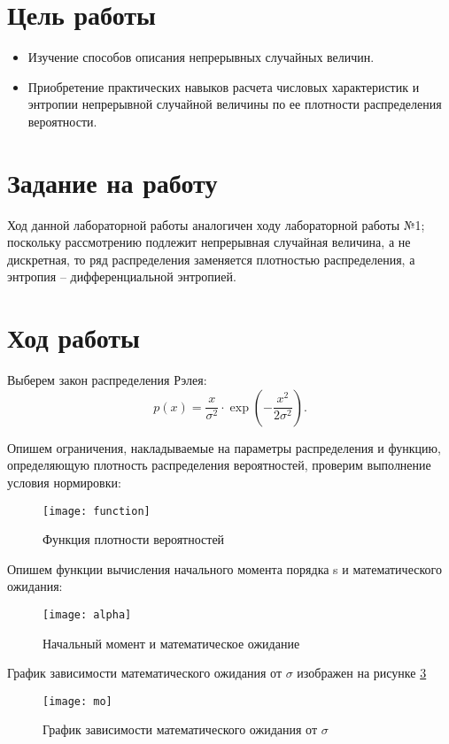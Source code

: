 \documentclass[a4paper,14pt]{extarticle}
\begin{document}

\section{Цель работы}
\begin{itemize}
    \item Изучение способов описания непрерывных случайных величин.
    \item Приобретение практических навыков расчета числовых характеристик
          и энтропии непрерывной случайной величины по ее плотности 
          распределения вероятности.
\end{itemize}

\section{Задание на работу}
Ход данной лабораторной работы аналогичен ходу лабораторной работы
№1; поскольку рассмотрению подлежит непрерывная случайная величина,
а не дискретная, то ряд распределения заменяется плотностью распределения,
а энтропия – дифференциальной энтропией.

\section{Ход работы}
Выберем закон распределения Рэлея:
\begin{equation*}
    p(x) = \frac{x}{\sigma^2} \cdot \exp{(-\frac{x^2}{2\sigma^2})}.
\end{equation*}

Опишем ограничения, накладываемые на параметры распределения и функцию,
определяющую плотность распределения вероятностей, проверим выполнение
условия нормировки:
\begin{figure}[H]
    \centering
    \texttt{[image: function]}
    \caption{Функция плотности вероятностей}
    \label{fig:function}
\end{figure}

Опишем функции вычисления начального момента порядка s и математического ожидания:
\begin{figure}[H]
    \centering
    \texttt{[image: alpha]}
    \caption{Начальный момент и математическое ожидание}
    \label{fig:alpha}
\end{figure}

График зависимости математического ожидания от $\sigma$ изображен на рисунке \ref{fig:mo}
\begin{figure}[H]
    \centering
    \texttt{[image: mo]}
    \caption{График зависимости математического ожидания от $\sigma$}
    \label{fig:mo}
\end{figure}
\end{document}
